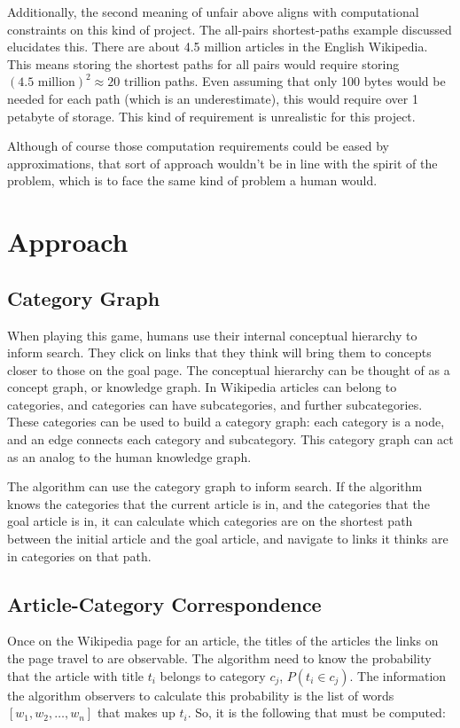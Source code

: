 \documentclass{article}
\begin{document}
Additionally, the second meaning of unfair above aligns with computational
constraints on this kind of project. The all-pairs shortest-paths example
discussed elucidates this. There are about 4.5 million articles in the English
Wikipedia. This means storing the shortest paths for all pairs would require
storing $(4.5 \text{ million})^2 \approx 20 \text{ trillion}$ paths. Even
assuming that only 100 bytes would be needed for each path (which is an
underestimate), this would require over 1 petabyte of storage. This kind of
requirement is unrealistic for this project.

Although of course those computation requirements could be eased by
approximations, that sort of approach wouldn't be in line with the spirit of the
problem, which is to face the same kind of problem a human would.

\section{Approach}
\subsection{Category Graph}
When playing this game, humans use their internal conceptual hierarchy to inform
search. They click on links that they think will bring them to concepts closer
to those on the goal page. The conceptual hierarchy can be thought of as a
concept graph, or knowledge graph. In Wikipedia articles can belong to
categories, and categories can have subcategories, and further subcategories.
These categories can be used to build a category graph: each category is a node,
and an edge connects each category and subcategory. This category graph can act
as an analog to the human knowledge graph.

The algorithm can use the category graph to inform search. If the algorithm
knows the categories that the current article is in, and the categories that the
goal article is in, it can calculate which categories are on the shortest path
between the initial article and the goal article, and navigate to links it
thinks are in categories on that path.

\subsection{Article-Category Correspondence}
Once on the Wikipedia page for an article, the titles of the articles the links
on the page travel to are observable. The algorithm need to know the probability
that the article with title $t_i$ belongs to category $c_j$, $P(t_i \in c_j)$.
The information the algorithm observers to calculate this probability is the
list of words $[w_1, w_2, \dots, w_n]$ that makes up $t_i$.  So, it is the following
that must be computed:
\end{document}
